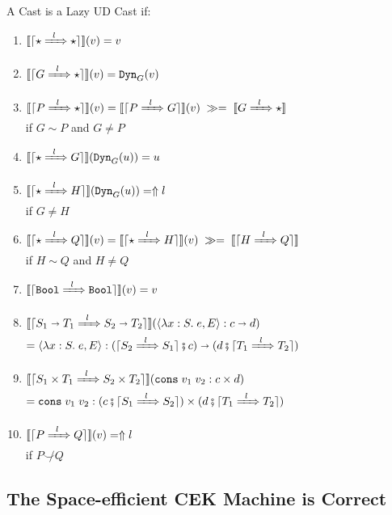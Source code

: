 \documentclass[runningheads]{llncs}
\newcommand{\error}[1]{\ensuremath{\Uparrow#1}}
\newcommand{\Tdyn}[0]{\ensuremath{\star}}
\newcommand{\Pbool}[0]{\ensuremath{\mathtt{Bool}}}
\newcommand{\Pfunc}[2]{\ensuremath{#1 \shortrightarrow #2}}
\newcommand{\Pprod}[2]{\ensuremath{#1 \times #2}}
\newcommand{\elam}[3]{\lambda#1:#2.\;#3}
\newcommand{\econs}[2]{\mathtt{cons} \; #1 \; #2}
\newcommand{\ecast}[2]{\ensuremath{#1 : #2}}
\newcommand{\ccast}[3]{#1 \xRightarrow[]{\enskip #2 \enskip} #3}
\newcommand{\vdyn}[2]{\mathtt{Dyn}_{#1}(#2)}
\newcommand{\vfunc}[4]{\langle\elam{#1}{#2}{#3},#4\rangle}
\newcommand{\vcons}[2]{\econs{#1}{#2}}
\newcommand{\mbind}[0]{\ensuremath{\;\gg=\;}}
\newcommand{\denote}[1]{\ensuremath{\llbracket #1 \rrbracket}}
\newcommand{\compose}[2]{\ensuremath{#1 \fatsemi #2}}
\newcommand{\translate}[1]{\ensuremath{\lceil#1\rceil}}
\newcommand{\notshallowlyconsistent}[2]{\ensuremath{#1\not\smile#2}}
\begin{document}
\begin{definition}
	\label{def:LazyUD-CastADT}
	A Cast is a Lazy UD Cast if:
	\begin{enumerate}
	\item $\denote{\translate{\ccast{\Tdyn}{l}{\Tdyn}}}(v) = v$
	\item $\denote{\translate{\ccast{G}{l}{\Tdyn}}}(v) = \vdyn{G}{v}$
	\item $\denote{\translate{\ccast{P}{l}{\Tdyn}}}(v) = 
		\denote{\translate{\ccast{P}{l}{G}}}(v) \mbind 
		\denote{\ccast{G}{l}{\Tdyn}}$\\
		if $G \sim P$ and $G \neq P$	
	\item $\denote{\translate{\ccast{\Tdyn}{l}{G}}}(\vdyn{G}{u}) = u$
	\item $\denote{\translate{\ccast{\Tdyn}{l}{H}}}(\vdyn{G}{u}) = \error{l}$\\
		if $G \neq H$
	\item $\denote{\translate{\ccast{\Tdyn}{l}{Q}}}(v) = 
		\denote{\translate{\ccast{\Tdyn}{l}{H}}}(v) \mbind
		\denote{\translate{\ccast{H}{l}{Q}}}$\\
		if $H \sim Q$ and $H \neq Q$
	\item $\denote{\translate{\ccast{\Pbool}{l}{\Pbool}}}(v) = v$
		\item 
		$\denote{\translate{\ccast{\Pfunc{S_1}{T_1}}{l}{\Pfunc{S_2}{T_2}}}}(
		\ecast{\vfunc{x}{S}{e}{E}}{\Pfunc{c}{d}})$\\
		$=
		\ecast{\vfunc{x}{S}{e}{E}}{
			\Pfunc{
				(\compose{\translate{\ccast{S_2}{l}{S_1}}}{c})}{
				(\compose{d}{\translate{\ccast{T_1}{l}{T_2}}})}}$
		\item 
		$\denote{\translate{\ccast{\Pprod{S_1}{T_1}}{l}{\Pprod{S_2}{T_2}}}}(
		\ecast{\vcons{v_1}{v_2}}{\Pprod{c}{d}})$\\
		$=
		\ecast{\vcons{v_1}{v_2}}{
			\Pprod{
				(\compose{c}{\translate{\ccast{S_1}{l}{S_2}}})}{
				(\compose{d}{\translate{\ccast{T_1}{l}{T_2}}})}}$
		\item $\denote{\translate{\ccast{P}{l}{Q}}}(v) = \error{l}$\\
			if $\notshallowlyconsistent{P}{Q}$
	\end{enumerate}
\end{definition}

\subsection{The Space-efficient CEK Machine is Correct}
\label{sec:S-correct}
\end{document}
